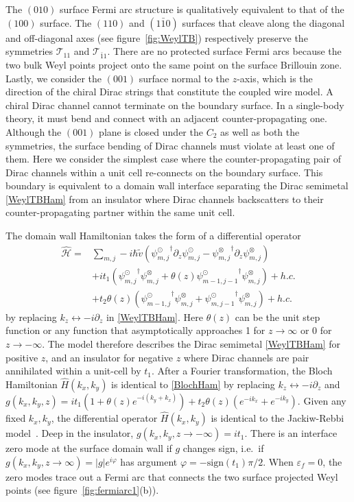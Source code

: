 The $(010)$ surface Fermi arc structure is qualitatively equivalent to that of the $(100)$ surface. The $(110)$ and $(1\bar{1}0)$ surfaces that cleave along the diagonal and off-diagonal axes (see figure~\ref{fig:WeylTB}) respectively preserve the \AFTR symmetries $\mathcal{T}_{11}$ and $\mathcal{T}_{\bar{1}1}$. There are no protected surface Fermi arcs because the two bulk Weyl points project onto the same point on the surface Brillouin zone. Lastly, we consider the $(001)$ surface normal to the $z$-axis, which is the direction of the chiral Dirac strings that constitute the coupled wire model. A chiral Dirac channel cannot terminate on the boundary surface. In a single-body theory, it must bend and connect with an adjacent counter-propagating one. Although the $(001)$ plane is closed under the $C_2$ as well as both the \AFTR symmetries, the surface bending of Dirac channels must violate at least one of them. Here we consider the simplest case where the counter-propagating pair of Dirac channels within a unit cell re-connects on the boundary surface. This boundary is equivalent to a domain wall interface separating the Dirac semimetal \eqref{WeylTBHam} from an insulator where Dirac channels backscatters to their counter-propagating partner within the same unit cell. 

The domain wall Hamiltonian takes the form of a differential operator
\begin{align}\hat{\mathcal{H}}=&\sum_{m,j}-i\hbar\tilde{v}\left({\psi_{m,j}^\odot}^\dagger\partial_z\psi_{m,j}^\odot-{\psi_{m,j}^\otimes}^\dagger\partial_z\psi_{m,j}^\otimes\right)\label{WeylTBHamwall}\\&+it_1\left({\psi_{m,j}^\odot}^\dagger\psi_{m,j}^\otimes+\theta(z){\psi_{m-1,j-1}^\odot}^\dagger\psi_{m,j}^\otimes\right)+h.c.\nonumber\\&+t_2\theta(z)\left({\psi_{m-1,j}^\odot}^\dagger\psi_{m,j}^\otimes+{\psi_{m,j-1}^\odot}^\dagger\psi_{m,j}^\otimes\right)+h.c.\nonumber\end{align} by replacing $k_z\leftrightarrow-i\partial_z$ in \eqref{WeylTBHam}. Here $\theta(z)$ can be the unit step function or any function that asymptotically approaches 1 for $z\to\infty$ or 0 for $z\to-\infty$. The model therefore describes the Dirac semimetal \eqref{WeylTBHam} for positive $z$, and an insulator for negative $z$ where Dirac channels are pair annihilated within a unit-cell by $t_1$. After a Fourier transformation, the Bloch Hamiltonian $\hat{H}(k_x,k_y)$ is identical to \eqref{BlochHam} by replacing $k_z\leftrightarrow-i\partial_z$ and $g(k_x,k_y,z)=it_1(1+\theta(z)e^{-i(k_y+k_x)})+t_2\theta(z)(e^{-ik_x}+e^{-ik_y})$. Given any fixed $k_x,k_y$, the differential operator $\hat{H}(k_x,k_y)$ is identical to the Jackiw-Rebbi model~\cite{JackiwRebbi76}. Deep in the insulator, $g(k_x,k_y,z\to-\infty)=it_1$. There is an interface zero mode at the surface domain wall if $g$ changes sign, i.e.~if $g(k_x,k_y,z\to\infty)=|g|e^{i\varphi}$ has argument $\varphi=-\mathrm{sign}(t_1)\pi/2$. When $\varepsilon_f=0$, the zero modes trace out a Fermi arc that connects the two surface projected Weyl points (see figure~\ref{fig:fermiarc1}(b)).

